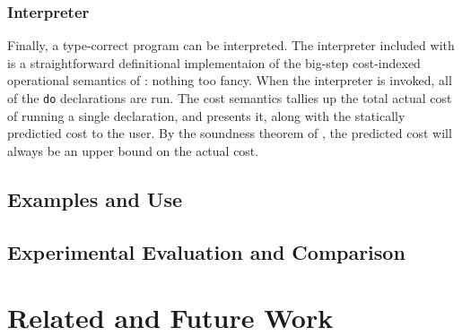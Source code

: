 \subsubsection{Interpreter}
Finally, a type-correct program can be interpreted. The interpreter included with \lambdaamorimpl is a straightforward definitional implementaion of the big-step cost-indexed operational semantics of \dlambdaamor: nothing too fancy. When the interpreter is invoked, all of the \texttt{do} declarations are run. The cost semantics tallies up the total actual cost of running a single declaration, and presents it, along with the statically predictied cost to the user. By the soundness theorem of \dlambdaamor, the predicted cost will always be an upper bound on the actual cost.

\subsection{Examples and Use}

\subsection{Experimental Evaluation and Comparison}


\section{Related and Future Work}
